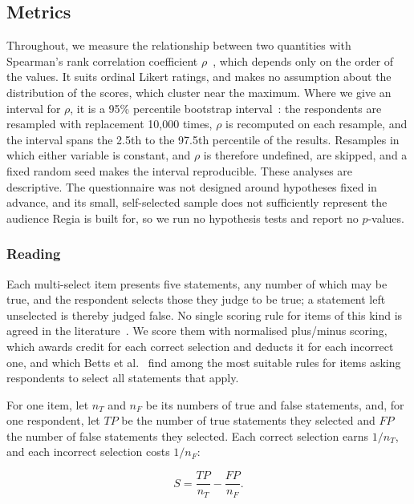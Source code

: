 \subsection{Metrics}
\label{sec:q-metrics}

Throughout, we measure the relationship between two quantities with Spearman's rank correlation coefficient $\rho$~\cite{Spearman1904}, which depends only on the order of the values. It suits ordinal Likert ratings, and makes no assumption about the distribution of the scores, which cluster near the maximum. Where we give an interval for $\rho$, it is a 95\% percentile bootstrap interval~\cite{Efron1993}: the respondents are resampled with replacement 10{,}000 times, $\rho$ is recomputed on each resample, and the interval spans the 2.5th to the 97.5th percentile of the results. Resamples in which either variable is constant, and $\rho$ is therefore undefined, are skipped, and a fixed random seed makes the interval reproducible. These analyses are descriptive. The questionnaire was not designed around hypotheses fixed in advance, and its small, self-selected sample does not sufficiently represent the audience Regia is built for, so we run no hypothesis tests and report no $p$-values.
 
\subsubsection{Reading}
 
Each multi-select item presents five statements, any number of which may be true, and the respondent selects those they judge to be true; a statement left unselected is thereby judged false. No single scoring rule for items of this kind is agreed in the literature~\cite{Schmidt2022}. We score them with normalised plus/minus scoring, which awards credit for each correct selection and deducts it for each incorrect one, and which Betts et al.~\cite{Betts2022} find among the most suitable rules for items asking respondents to select all statements that apply.
 
For one item, let $n_T$ and $n_F$ be its numbers of true and false statements, and, for one respondent, let $TP$ be the number of true statements they selected and $FP$ the number of false statements they selected. Each correct selection earns $1/n_T$, and each incorrect selection costs $1/n_F$:

\begin{equation}
S = \frac{TP}{n_T} - \frac{FP}{n_F}.
\label{eq:plus-minus}
\end{equation}

